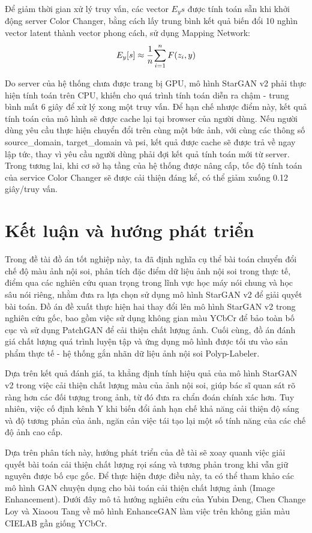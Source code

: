 \documentclass[12pt]{extreport}
\begin{document}
Để giảm thời gian xử lý truy vấn, các vector $ E_y{s} $ được tính toán sẵn khi khởi động server Color Changer, bằng cách lấy trung bình kết quả biến đổi 10 nghìn vector latent thành vector phong cách, sử dụng Mapping Network:
$$ E_y[s] \approx \cfrac{1}{n} \sum_{i = 1}^{n} F(z_{i}, y) $$

Do server của hệ thống chưa được trang bị GPU, mô hình StarGAN v2 phải thực hiện tính toán trên CPU, khiến cho quá trình tính toán diễn ra chậm - trung bình mất 6 giây để xử lý xong một truy vấn. Để hạn chế nhược điểm này, kết quả tính toán của mô hình sẽ được cache lại tại browser của người dùng. Nếu người dùng yêu cầu thực hiện chuyển đổi trên cùng một bức ảnh, với cùng các thông số source\_domain, target\_domain và psi, kết quả được cache sẽ được trả về ngay lập tức, thay vì yêu cầu người dùng phải đợi kết quả tính toán mới từ server. Trong tương lai, khi cơ sở hạ tầng của hệ thống được nâng cấp, tốc độ tính toán của service Color Changer sẽ được cải thiện đáng kể, có thể giảm xuống 0.12 giây/truy vấn.

\chapter{Kết luận và hướng phát triển}

Trong đề tài đồ án tốt nghiệp này, ta đã định nghĩa cụ thể bài toán chuyển đổi chế độ màu ảnh nội soi, phân tích đặc điểm dữ liệu ảnh nội soi trong thực tế, điểm qua các nghiên cứu quan trọng trong lĩnh vực học máy nói chung và học sâu nói riêng, nhằm đưa ra lựa chọn sử dụng mô hình StarGAN v2 để giải quyết bài toán. Đồ án đề xuất thực hiện hai thay đổi lên mô hình StarGAN v2 trong nghiên cứu gốc, bao gồm việc sử dụng không gian màu YCbCr để bảo toàn bố cục và sử dụng PatchGAN để cải thiện chất lượng ảnh. Cuối cùng, đồ án đánh giá chất lượng quá trình luyện tập và ứng dụng mô hình được tối ưu vào sản phẩm thực tế - hệ thống gắn nhãn dữ liệu ảnh nội soi Polyp-Labeler.

Dựa trên kết quả đánh giá, ta khẳng định tính hiệu quả của mô hình StarGAN v2 trong việc cải thiện chất lượng màu của ảnh nội soi, giúp bác sĩ quan sát rõ ràng hơn các đối tượng trong ảnh, từ đó đưa ra chẩn đoán chính xác hơn. Tuy nhiên, việc cố định kênh Y khi biến đổi ảnh hạn chế khả năng cải thiện độ sáng và độ tương phản của ảnh, ngăn cản việc tái tạo lại một số tính năng của các chế độ ảnh cao cấp.

Dựa trên phân tích này, hướng phát triển của đề tài sẽ xoay quanh việc giải quyết bài toán cải thiện chất lượng rọi sáng và tương phản trong khi vẫn giữ nguyên được bố cục gốc. Để thực hiện được điều này, ta có thể tham khảo các mô hình GAN chuyện dụng cho bài toán cải thiện chất lượng ảnh (Image Enhancement). Dưới đây mô tả hướng nghiên cứu của Yubin Deng, Chen Change Loy và Xiaoou Tang về mô hình EnhanceGAN \cite{DBLP:journals/corr/DengLT17} làm việc trên không giản màu CIELAB gần giống YCbCr.
\end{document}

